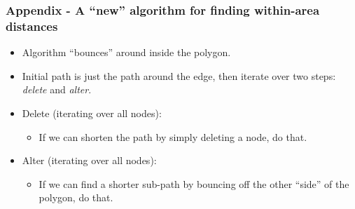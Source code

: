 \documentclass[ignorenonframetext]{beamer} %
\newcommand{\bi}{\begin{itemize}}
\newcommand{\ei}{\end{itemize}}
\begin{document}
\begin{frame}
	\frametitle{Appendix - A ``new'' algorithm for finding within-area distances}
	\bi
		\item Algorithm ``bounces'' around inside the polygon.
		\item Initial path is just the path around the edge, then iterate over two steps: \textit{delete} and \textit{alter}.
		\item Delete (iterating over all nodes):
			\bi \item If we can shorten the path by simply deleting a node, do that.
			\ei
		\item Alter (iterating over all nodes):
			\bi \item If we can find a shorter sub-path by bouncing off the other ``side'' of the polygon, do that.
			\ei
	\ei
\end{frame}
\end{document}
